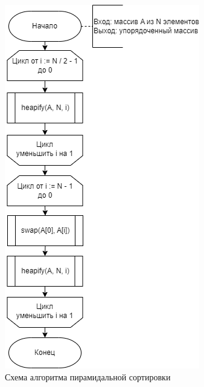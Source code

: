 \documentclass[a4paper,14pt, unknownkeysallowed]{extreport}
\begin{document}
\begin{figure}[h!]
	\centering
	\includegraphics[width=0.7\linewidth]{img/heap_sort.png}
	\caption{Схема алгоритма пирамидальной сортировки}
	\label{fig:heap_sort}
\end{figure}
	
\end{document}
